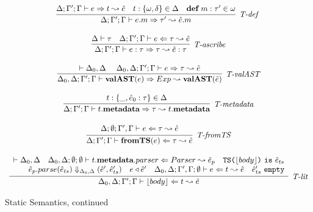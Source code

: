 \begin{figure}
\[\begin{array}{c}
 
\infer[\textit{T-def }]
	{\Delta; \Gamma'; \Gamma \vdash  e.m \Rightarrow \tau' \leadsto \hat{e}.m} 
	{\Delta; \Gamma'; \Gamma \vdash e \Rightarrow t \leadsto \hat{e} & t: \{\omega, \delta\} \in \Delta & \keyw{def}\ m:\tau' \in \omega }\\[3ex]

\infer[\textit{T-ascribe}]
	{\Delta; \Gamma'; \Gamma  \vdash  e:\tau \Rightarrow \tau \leadsto \hat{e}:\tau}
	{\Delta \vdash \tau & \Delta; \Gamma'; \Gamma \vdash e \Leftarrow \tau \leadsto \hat{e} } \\[3ex]

\infer[\textit{T-valAST}]
        {\Delta_0, \Delta; \Gamma'; \Gamma \vdash \keyw{valAST}(e) \Rightarrow Exp \leadsto \keyw{valAST}(\hat{e}) }
	{\vdash \Delta_0, \Delta ~~~~ \Delta_0, \Delta; \Gamma'; \Gamma \vdash e \Rightarrow \tau \leadsto \hat{e}} \\[3ex]

\infer[\textit{T-metadata}]
        {\Delta; \Gamma'; \Gamma \vdash t.\keyw{metadata} \Rightarrow \tau \leadsto t.\keyw{metadata}  }
	{t:\{\_, \hat{e}_0:\tau\} \in \Delta} \\[3ex]

\infer[\textit{T-fromTS}]
	  {\Delta; \Gamma'; \Gamma \vdash \keyw{fromTS}(e) \Leftarrow \tau \leadsto \hat{e} }
	  {\renewcommand{\arraystretch}{1}
	    \begin{array}{r}
	    \Delta; \emptyset; \Gamma', \Gamma \vdash e \Leftarrow \tau \leadsto \hat{e}
            \end{array}
       } \\[3ex]  

\infer[\textit{T-lit}]
	  {\Delta_0, \Delta; \Gamma'; \Gamma \vdash \lfloor body \rfloor \Leftarrow t \leadsto \hat{e} }
	  {\renewcommand{\arraystretch}{1}
	    \begin{array}{r}
	    \vdash \Delta_0, \Delta ~~~ \Delta_0, \Delta ;\emptyset; \emptyset \vdash t.\keyw{metadata}.parser\Leftarrow Parser \leadsto \hat{e}_p ~~~ \texttt{TS(}\lfloor body \rfloor \texttt{)}\ \texttt{is}\ \hat{e}_{ts}\\
            \hat{e}_p.parse(\hat{e}_{ts}) \Downarrow_{\Delta_0, \Delta} (\hat{e}', \hat e_{ts}') ~~~  e \triangleleft  \hat{e}'~~~ \Delta_0, \Delta;\Gamma', \Gamma; \emptyset\vdash e\Leftarrow t \leadsto \hat{e} ~~~ \hat e_{ts}'\ \texttt{empty}
            \end{array}
       }
\end{array}
\]
\vspace{-10px}
\label{fig:statics2}
\caption{Static Semantics, continued}
\vspace{-10px}
\end{figure}

